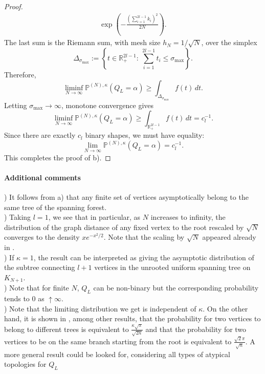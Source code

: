 \documentclass[11pt]{article}
\begin{document}
\begin{proof}
\begin{align*}
\exp\!\left(-\frac{(\sum_{i=1}^{2l-1}k_i)^2}{2N}\right).
\end{align*}
\medskip
\noindent
The last sum is the Riemann sum, with mesh size \(h_N=1/\sqrt N\), over the
simplex
\[
\Delta_{\sigma_{\max}}
:=
\left\{
t\in\mathbb R_+^{2l-1}:\ \sum_{i=1}^{2l-1}t_i\le \sigma_{\max}
\right\}.
\]
Therefore,
\[
\liminf_{N\to\infty}
\mathbb P^{(N),\kappa}(Q_L=\alpha)
\ge
\int_{\Delta_{\sigma_{\max}}} f(t)\,dt .
\]
\medskip
\noindent
Letting $\sigma_{\max}\to\infty$, monotone convergence gives
\[
\liminf_{N\to\infty}
\mathbb P^{(N),\kappa}(Q_L=\alpha)
\ge
\int_{\mathbb R_+^{2l-1}} f(t)\,dt
=
c_l^{-1}.
\]
\medskip
\noindent
Since there are exactly $c_l$ binary shapes, we must have equality:
\[
\lim_{N\to\infty}
\mathbb P^{(N),\kappa}(Q_L=\alpha)
=
c_l^{-1}.
\]
This completes the proof of b).
\end{proof}



 \paragraph{Additional comments}
 \medskip
{}) It follows from a) that any finite set of vertices asymptotically belong to the same tree of the spanning forest. \\
 
\medskip
{}) Taking $l=1$, we see that in particular, as $N$ increases to infinity, the distribution of the graph distance of any fixed vertex to the root rescaled by $\sqrt N$ converges to the density $xe^{-x^2/2}$. Note that the scaling by $\sqrt N$ appeared already in \cite{Szkr}.
\\

\medskip
{}) If $\kappa=1$, the result can be interpreted as giving the asymptotic distribution of the subtree connecting $l+1$ vertices in the unrooted uniform spanning tree on $K_{N+1}$. \\

 \medskip
{}) Note that for finite $N$, $Q_L$ can be non-binary but the corresponding  probability tends to 0 as $\uparrow \infty$.  \\
 
\medskip
{})  Note that the limiting distribution we get is independent of $\kappa$.
On the other hand, it is shown in \cite{book}, among other results, that the probability  for two vertices to belong to different trees is equivalent to $\frac{\kappa\sqrt \pi}{\sqrt{2n}}$ and that the  probability  for two vertices to be on the same branch starting from the root is equivalent to $\frac{\sqrt 2 \pi}{\sqrt{n}}$. A more general result could be looked for, considering all types of atypical topologies for $Q_L$\\
\end{document}
